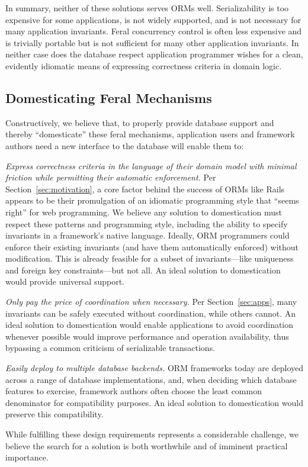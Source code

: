 In summary, neither of these solutions serves ORMs
well. Serializability is too expensive for some applications, is not
widely supported, and is not necessary for many application
invariants. Feral concurrency control is often less expensive and is
trivially portable but is not sufficient for many other application
invariants. In neither case does the database respect application
programmer wishes for a clean, evidently idiomatic means of expressing
correctness criteria in domain logic.

\subsection{Domesticating Feral Mechanisms}

Constructively, we believe that, to properly provide database support
and thereby ``domesticate'' these feral mechanisms, application users
and framework authors need a new interface to the database will enable
them to:
\begin{interfaceenumerate} 
\item \textit{Express correctness criteria in the language of their
    domain model with minimal friction while permitting their
    automatic enforcement.} Per Section~\ref{sec:motivation}, a core
  factor behind the success of ORMs like Rails appears to be their
  promulgation of an idiomatic programming style that ``seems right''
  for web programming. We believe any solution to domestication must
  respect these patterns and programming style, including the ability
  to specify invariants in a framework's native language. Ideally, ORM
  programmers could enforce their existing invariants (and have them
  automatically enforced) without modification. This is already
  feasible for a subset of invariants---like uniqueness and foreign
  key constraints---but not all. An ideal solution to domestication
  would provide universal support.

\item \textit{Only pay the price of coordination when necessary.} Per
  Section~\ref{sec:apps}, many invariants can be safely executed
  without coordination, while others cannot. An ideal solution to
  domestication would enable applications to avoid coordination
  whenever possible would improve performance and operation
  availability, thus bypassing a common criticism of serializable
  transactions.

\item \textit{Easily deploy to multiple database backends.}  ORM
  frameworks today are deployed across a range of database
  implementations, and, when deciding which database features to
  exercise, framework authors often choose the least common
  denominator for compatibility purposes. An ideal solution to
  domestication would preserve this compatibility.

\end{interfaceenumerate}
While fulfilling these design requirements represents a considerable
challenge, we believe the search for a solution is both worthwhile and
of imminent practical importance.

